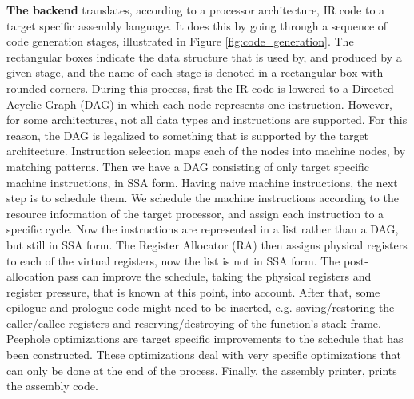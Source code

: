 \textbf{The backend} translates, according to a processor architecture, IR code to a target specific assembly language. It does this by going through a sequence of code generation stages, illustrated in Figure \ref{fig:code_generation}. The rectangular boxes indicate the data structure that is used by, and produced by a given stage, and the name of each stage is denoted in a rectangular box with rounded corners. During this process, first the IR code is lowered to a Directed Acyclic Graph (DAG) in which each node represents one instruction. However, for some architectures, not all data types and instructions are supported. For this reason, the DAG is legalized to something that is supported by the target architecture. Instruction selection maps each of the nodes into machine nodes, by matching patterns. %
Then we have a DAG consisting of only target specific machine instructions, in SSA form. Having naive machine instructions, the next step is to schedule them. We schedule the machine instructions according to the resource information of the target processor, and assign each instruction to a specific cycle. 
Now the instructions are represented in a list rather than a DAG, but still in SSA form. The Register Allocator (RA) then assigns physical registers to each of the virtual registers, now the list is not in SSA form. 
The post-allocation pass can improve the schedule, taking the physical registers and register pressure, that is known at this point, into account. After that, some epilogue and prologue code might need to be inserted, e.g. saving/restoring the caller/callee registers and reserving/destroying of the function's stack frame. Peephole optimizations are target specific improvements to the schedule that has been constructed. These optimizations deal with very specific optimizations that can only be done at the end of the process. Finally, the assembly printer, prints the assembly code.






